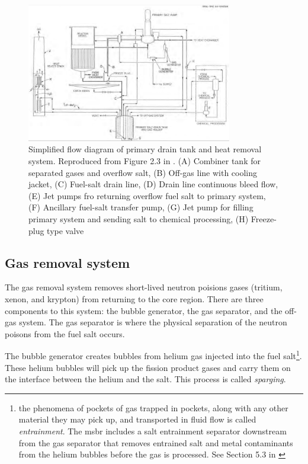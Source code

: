 \begin{figure}[htpb]
    \centering
    \includegraphics[width=0.8\textwidth]{figs/ch4/msbr_primary_system.png}
    \caption{Simplified flow diagram of primary drain tank and heat removal system. Reproduced from Figure 2.3 in \cite{robertson_conceptual_1971}. (A) Combiner tank for separated gases and overflow salt, (B) Off-gas line with cooling jacket, (C) Fuel-salt drain line, (D) Drain line continuous bleed flow, (E) Jet pumps fro returning overflow fuel salt to primary system, (F) Ancillary fuel-salt transfer pump, (G) Jet pump for filling primary system and sending salt to chemical processing, (H) Freeze-plug type valve }
    \label{fig:msbr_primary_system}
\end{figure}

\subsection{Gas removal system}
The gas removal system removes short-lived neutron poisions gases (tritium, xenon, and krypton) from returning to the core region. There are three components to this system: the bubble generator, the gas separator, and the off-gas system. The gas separator is where the physical separation of the neutron poisons from the fuel salt occurs.

The bubble generator creates bubbles from helium gas injected into the fuel salt\footnote{the phenomena of pockets of gas trapped in pockets, along with any other material they may pick up, and transported in fluid flow is called {\it entrainment}. The \Gls{msbr} includes a salt entrainment separator downstream from the gas separator that removes entrained salt and metal contaminants from the helium bubbles before the gas is processed. See Section 5.3 in
\cite{rosenthal_molten-salt_1968}}. These helium bubbles will pick up the fission product gases and carry them on the interface between the helium and the salt. This process is called {\it sparging}.

